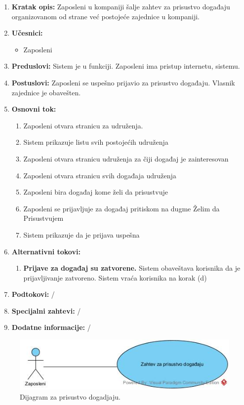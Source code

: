 \documentclass[a4paper]{article}
\begin{document}
\begin{enumerate}
    \item \textbf{Kratak opis:} Zaposleni u kompaniji šalje zahtev za prisustvo događaju organizovanom od strane već postojeće zajednice u kompaniji.
    \item \textbf{Učesnici:}
        \begin{itemize}
            \item Zaposleni
        \end{itemize}
    \item \textbf{Preduslovi:} Sistem je u funkciji. Zaposleni ima pristup internetu, sistemu.
    \item \textbf{Postuslovi:} Zaposleni se uspešno prijavio za prisustvo događaju. Vlasnik zajednice je obavešten.
    \item \textbf{Osnovni tok:}
        \begin{enumerate}
            \item Zaposleni otvara stranicu za udruženja.
            \item Sistem prikazuje listu svih postojećih udruženja
            \item Zaposleni otvara stranicu udruženja za čiji događaj je zainteresovan
            \item Zaposleni otvara stranicu svih događaja udruženja
            \item Zaposleni bira događaj kome želi da prisustvuje
            \item Zaposleni se prijavljuje za događaj pritiskom na dugme Želim da Prisustvujem
            \item Sistem prikazuje da je prijava uspešna 
        \end{enumerate}
    \item \textbf{Alternativni tokovi:}
        \begin{enumerate}
            \item \textbf{Prijave za događaj su zatvorene.} Sistem obaveštava korisnika da je prijavljivanje zatvoreno. Sistem vraća korisnika na korak (d)
        \end{enumerate}
    \item \textbf{Podtokovi:} /
    \item \textbf{Specijalni zahtevi:} /
    \item \textbf{Dodatne informacije:} /
\end{enumerate}

\begin{figure} [!ht]
    \begin{center}
        \includegraphics[scale=0.5]{Korisnici/Udruzenje/UML/SlucajUpotrebe_PrisustvoDogadjaju.jpg}
    \end{center}
\caption{Dijagram za prisustvo dogadjaju.}
\end{figure}
\end{document}
